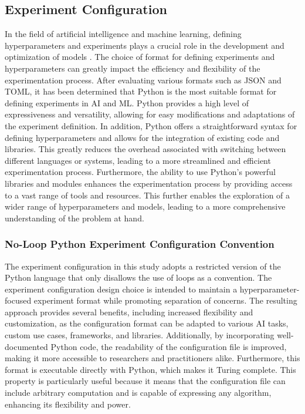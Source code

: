 \documentclass{article}
\begin{document}
\subsection{Experiment Configuration}

In the field of artificial intelligence and machine learning, defining hyperparameters and experiments plays a crucial role in the development and optimization of models \cite{wu2019hyperparameter}. The choice of format for defining experiments and hyperparameters can greatly impact the efficiency and flexibility of the experimentation process. After evaluating various formats such as JSON and TOML, it has been determined that Python is the most suitable format for defining experiments in AI and ML. Python provides a high level of expressiveness and versatility, allowing for easy modifications and adaptations of the experiment definition. In addition, Python offers a straightforward syntax for defining hyperparameters and allows for the integration of existing code and libraries. This greatly reduces the overhead associated with switching between different languages or systems, leading to a more streamlined and efficient experimentation process. Furthermore, the ability to use Python's powerful libraries and modules enhances the experimentation process by providing access to a vast range of tools and resources. This further enables the exploration of a wider range of hyperparameters and models, leading to a more comprehensive understanding of the problem at hand.

\subsubsection{No-Loop Python Experiment Configuration Convention}

The experiment configuration in this study adopts a restricted version of the Python language that only disallows the use of loops as a convention. The experiment configuration design choice is intended to maintain a hyperparameter-focused experiment format while promoting separation of concerns. The resulting approach provides several benefits, including increased flexibility and customization, as the configuration format can be adapted to various AI tasks, custom use cases, frameworks, and libraries. Additionally, by incorporating well-documented Python code, the readability of the configuration file is improved, making it more accessible to researchers and practitioners alike. Furthermore, this format is executable directly with Python, which makes it Turing complete. This property is particularly useful because it means that the configuration file can include arbitrary computation and is capable of expressing any algorithm, enhancing its flexibility and power.
\end{document}
